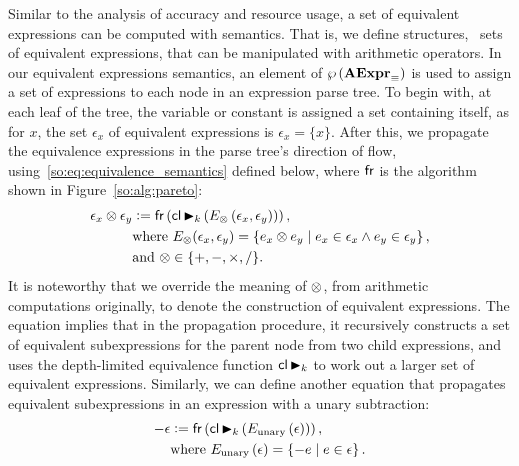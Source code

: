 Similar to the analysis of accuracy and resource usage, a set of equivalent
expressions can be computed with semantics. That is, we define structures,
\ie~sets of equivalent expressions, that can be manipulated with arithmetic
operators. In our equivalent expressions semantics, an element of
$\wp\left({\mathbf{AExpr}_\equiv}\right)$ is used to assign a set of expressions to each node in
an expression parse tree. To begin with, at each leaf of the tree, the
variable or constant is assigned a set containing itself, as for $x$, the set
$\epsilon_x$ of equivalent expressions is $\epsilon_x = \{x\}$. After this, we
propagate the equivalence expressions in the parse tree's direction of flow,
using~\eqref{so:eq:equivalence_semantics} defined below, where $\operatorname{\mathsf{fr}}$ is
the algorithm shown in Figure~\ref{so:alg:pareto}:
\begin{equation}
    \begin{aligned}
        \epsilon_x \otimes \epsilon_y &\vcentcolon= \operatorname{\mathsf{fr}}\left(
            \operatorname{\mathsf{cl}} \operatorname{\blacktriangleright}_k \left(
                E_\otimes \left( \epsilon_x, \epsilon_y \right)
            \right) \right), \\
        & \text{where~}
        E_\otimes(\epsilon_x, \epsilon_y) = \left\{
            e_x \otimes e_y \mid e_x \in \epsilon_x \wedge e_y \in \epsilon_y
        \right\}, \\
        & \text{and~} \otimes\in\{ +, -, \times, / \}.
    \end{aligned}
    \label{so:eq:equivalence_semantics}
\end{equation}
It is noteworthy that we override the meaning of $\otimes$, from arithmetic
computations originally, to denote the construction of equivalent expressions.
The equation implies that in the propagation procedure, it recursively
constructs a set of equivalent subexpressions for the parent node from two
child expressions, and uses the depth-limited equivalence function $\operatorname{\mathsf{cl}}
\operatorname{\blacktriangleright}_k$ to work out a larger set of equivalent expressions.  Similarly, we
can define another equation that propagates equivalent subexpressions in an
expression with a unary subtraction:
\begin{equation}
    \begin{aligned}
        -\epsilon &\vcentcolon= \operatorname{\mathsf{fr}}\left(
            \operatorname{\mathsf{cl}} \operatorname{\blacktriangleright}_k \left(
                E_{\mathrm{unary}} \left( \epsilon \right)
            \right) \right), \\
        & \text{where~}
        E_\mathrm{unary} \left( \epsilon \right) = \left\{
            -e \mid e \in \epsilon
        \right\}.
    \end{aligned}
    \label{so:eq:equivalence_semantics_unary}
\end{equation}

